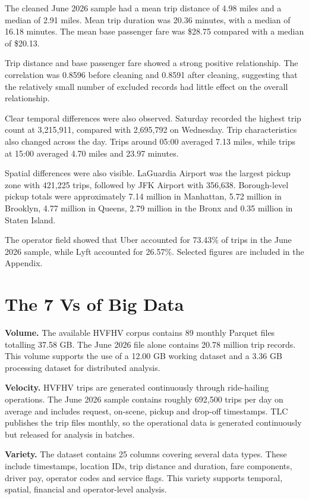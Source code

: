 \documentclass[10pt,twocolumn]{article}
\begin{document}
The cleaned June 2026 sample had a mean trip distance of 4.98 miles
and a median of 2.91 miles. Mean trip duration was 20.36 minutes,
with a median of 16.18 minutes. The mean base passenger fare was
\$28.75 compared with a median of \$20.13.

Trip distance and base passenger fare showed a strong positive
relationship. The correlation was 0.8596 before cleaning and 0.8591
after cleaning, suggesting that the relatively small number of excluded
records had little effect on the overall relationship.

Clear temporal differences were also observed. Saturday recorded the
highest trip count at 3,215,911, compared with 2,695,792 on Wednesday.
Trip characteristics also changed across the day. Trips around 05:00
averaged 7.13 miles, while trips at 15:00 averaged 4.70 miles and
23.97 minutes.

Spatial differences were also visible. LaGuardia Airport was the
largest pickup zone with 421,225 trips, followed by JFK Airport with
356,638. Borough-level pickup totals were approximately 7.14 million
in Manhattan, 5.72 million in Brooklyn, 4.77 million in Queens,
2.79 million in the Bronx and 0.35 million in Staten Island.

The operator field showed that Uber accounted for 73.43\% of trips in
the June 2026 sample, while Lyft accounted for 26.57\%. Selected
figures are included in the Appendix.


\section{The 7 Vs of Big Data}

\textbf{Volume.}
The available HVFHV corpus contains 89 monthly Parquet files totalling
37.58 GB. The June 2026 file alone contains 20.78 million trip records.
This volume supports the use of a 12.00 GB working dataset and a
3.36 GB processing dataset for distributed analysis.

\textbf{Velocity.}
HVFHV trips are generated continuously through ride-hailing operations.
The June 2026 sample contains roughly 692,500 trips per day on average
and includes request, on-scene, pickup and drop-off timestamps. TLC
publishes the trip files monthly, so the operational data is generated
continuously but released for analysis in batches.

\textbf{Variety.}
The dataset contains 25 columns covering several data types. These
include timestamps, location IDs, trip distance and duration, fare
components, driver pay, operator codes and service flags. This variety
supports temporal, spatial, financial and operator-level analysis.
\end{document}

